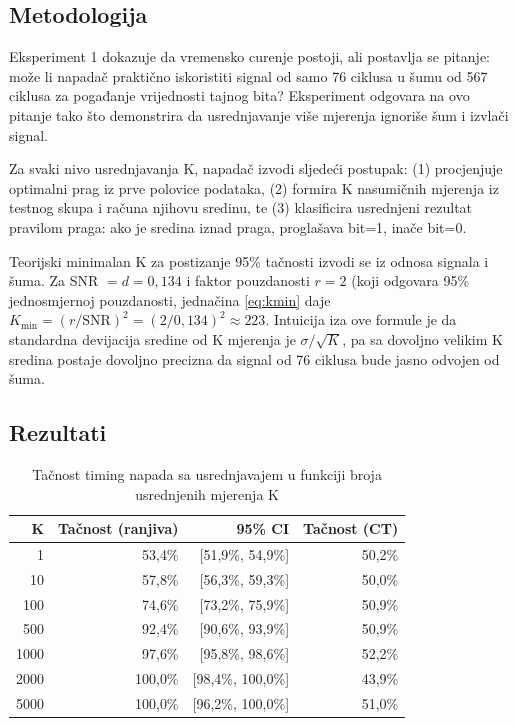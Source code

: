 \subsection{Metodologija}

Eksperiment 1 dokazuje da vremensko curenje postoji, ali postavlja se pitanje: može li napadač praktično iskoristiti signal od samo 76 ciklusa u šumu od 567 ciklusa za pogađanje vrijednosti tajnog bita? Eksperiment odgovara na ovo pitanje tako što demonstrira da usrednjavanje više mjerenja ignoriše šum i izvlači signal.

Za svaki nivo usrednjavanja K, napadač izvodi sljedeći postupak: (1) procjenjuje optimalni prag iz prve polovice podataka, (2) formira K nasumičnih mjerenja iz testnog skupa i računa njihovu sredinu, te (3) klasificira usrednjeni rezultat pravilom praga: ako je sredina iznad praga, proglašava bit=1, inače bit=0.

Teorijski minimalan K za postizanje 95\% tačnosti izvodi se iz odnosa signala i šuma. Za SNR $= d = 0{,}134$ i faktor pouzdanosti $r = 2$ (koji odgovara 95\% jednosmjernoj pouzdanosti, jednačina \ref{eq:kmin} daje $K_{\min} = (r/\text{SNR})^2 = (2/0{,}134)^2 \approx 223$. Intuicija iza ove formule je da standardna devijacija sredine od K mjerenja je $\sigma/\sqrt{K}$, pa sa dovoljno velikim K sredina postaje dovoljno precizna da signal od 76 ciklusa bude jasno odvojen od šuma.

\subsection{Rezultati}

\begin{table}[H]
\centering
\caption{Tačnost timing napada sa usrednjavajem u funkciji broja usrednjenih mjerenja K}
\label{tab:averaging}
\begin{tabular}{rrrr}
\toprule
\textbf{K} & \textbf{Tačnost (ranjiva)} & \textbf{95\% CI} & \textbf{Tačnost (CT)} \\
\midrule
1      & 53{,}4\% & [51{,}9\%, 54{,}9\%] & 50{,}2\% \\
10     & 57{,}8\% & [56{,}3\%, 59{,}3\%] & 50{,}0\% \\
100    & 74{,}6\% & [73{,}2\%, 75{,}9\%] & 50{,}9\% \\
500    & 92{,}4\% & [90{,}6\%, 93{,}9\%] & 50{,}9\% \\
1000   & 97{,}6\% & [95{,}8\%, 98{,}6\%] & 52{,}2\% \\
2000   & 100{,}0\% & [98{,}4\%, 100{,}0\%] & 43{,}9\% \\
5000   & 100{,}0\% & [96{,}2\%, 100{,}0\%] & 51{,}0\% \\
\bottomrule
\end{tabular}
\end{table}

